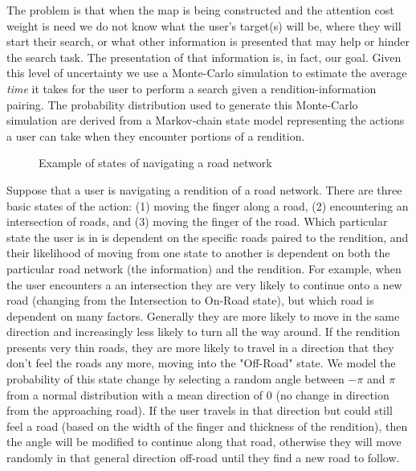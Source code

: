 The problem is that when the map is being constructed and the attention cost weight is need we do not know what the user's target(s) will be, where they will start their search, or what other information is presented that may help or hinder the search task. The presentation of that information is, in fact, our goal. Given this level of uncertainty we use a Monte-Carlo simulation to estimate the average \textit{time} it takes for the user to perform a search given a rendition-information pairing. The probability distribution used to generate this Monte-Carlo simulation are derived from a Markov-chain state model representing the actions a user can take when they encounter portions of a rendition. 
\begin{figure}
\label{fig::exampleStates}
\caption{Example of states of navigating a road network}
\end{figure}

Suppose that a user is navigating a rendition of a road network. There are three basic states of the action: (1) moving the finger along a road, (2) encountering an intersection of roads, and (3) moving the finger of the road. Which particular state the user is in is dependent on the specific roads paired to the rendition, and their likelihood of moving from one state to another is dependent on both the particular road network (the information) and the rendition. For example, when the user encounters a an intersection they are very likely to continue onto a new road (\eg changing from the Intersection to On-Road state), but which road is dependent on many factors. Generally they are more likely to move in the same direction and increasingly less likely to turn all the way around. If the rendition presents very thin roads, they are more likely to travel in a direction that they don't feel the roads any more, moving into the "Off-Road" state. We model the probability of this state change by selecting a random angle between $-\pi$ and $\pi$ from a normal distribution with a mean direction of 0 (no change in direction from the approaching road). If the user travels in that direction but could still feel a road (based on the width of the finger and thickness of the rendition), then the angle will be modified to continue along that road, otherwise they will move randomly in that general direction off-road until they find a new road to follow.  

